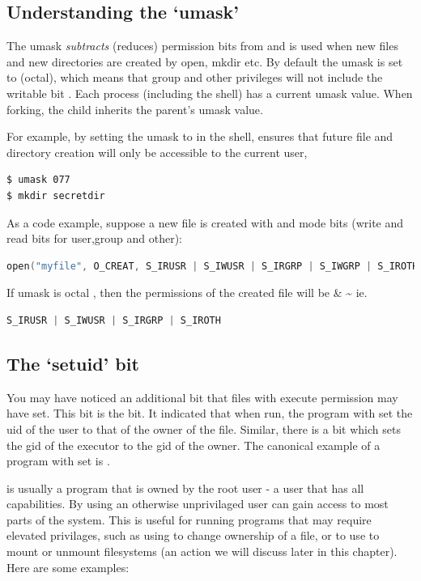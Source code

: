 \subsection{Understanding the `umask'}

The umask \emph{subtracts} (reduces) permission bits from  and is used when new files and new directories are created by open, mkdir etc. By default the umask is set to  (octal), which means that group and other privileges will not include the writable bit . Each process (including the shell) has a current umask value. When forking, the child inherits the parent's umask value.

For example, by setting the umask to  in the shell, ensures that future file and directory creation will only be accessible to the current user,

\begin{lstlisting}
$ umask 077
$ mkdir secretdir
\end{lstlisting}

As a code example, suppose a new file is created with  and mode bits  (write and read bits for user,group and other):

\begin{lstlisting}[language=C]
open("myfile", O_CREAT, S_IRUSR | S_IWUSR | S_IRGRP | S_IWGRP | S_IROTH | S_IWOTH);
\end{lstlisting}

If umask is octal , then the permissions of the created file will be  \& \textasciitilde{} ie.

\begin{lstlisting}[language=C]
S_IRUSR | S_IWUSR | S_IRGRP | S_IROTH
\end{lstlisting}

\subsection{The `setuid' bit}

You may have noticed an additional bit that files with execute permission may have set. This bit is the  bit. It indicated that when run, the program with set the uid of the user to that of the owner of the file. Similar, there is a  bit which sets the gid of the executor to the gid of the owner. The canonical example of a program with  set is .

 is usually a program that is owned by the root user - a user that has all capabilities. By using  an otherwise unprivilaged user can gain access to most parts of the system. This is useful for running programs that may require elevated privilages, such as using  to change ownership of a file, or to use  to mount or unmount filesystems (an action we will discuss later in this chapter). Here are some examples:

